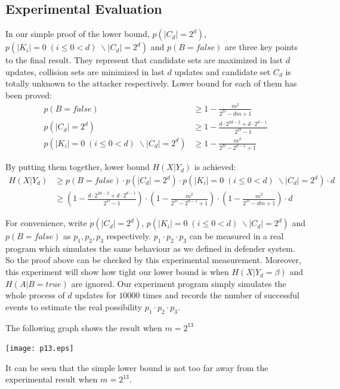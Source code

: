 \documentclass[10pt,a4paper]{article}
\begin{document}
	\subsection{Experimental Evaluation}
		In our simple proof of the lower bound, $p(|C_d| = 2^d)$,
		$p(|K_i| = 0 \; (i \leq 0 < d) \; \backslash |C_d| = 2^d)$ and $p(B = false)$ are 
		three key points to the final result.
		They represent that candidate sets are maximized in
		last $d$ updates, collision sets are minimized in
		last $d$ updates and candidate set $C_d$ is totally unknown
		to the attacker respectively.
		Lower bound for each of them has been proved:
		\begin{align*}
			p(B = false) &\geq 1-\frac{m^2}{2^D-dm+1}\\
			p(|C_d| = 2^d) &\geq 1-\frac{d \cdot 2^{2d-2}+d \cdot 2^{d-1}}{2^D-1}\\
			p(|K_i| = 0 \; (i \leq 0 < d) \; \backslash |C_d| = 2^d) &\geq 1-\frac{m^2}{2^D-2^{d-1}+1}
		\end{align*}
		
		By putting them together, lower bound $H(X | Y_d)$ is achieved:
		\begin{align*}
			H(X | Y_d) &\geq p(B = false) \cdot p(|C_d| = 2^d) \cdot 
				p(|K_i| = 0 \; (i \leq 0 < d) \; \backslash |C_d| = 2^d) \cdot d\\
				&\geq (1-\frac{d \cdot 2^{2d-2}+d \cdot 2^{d-1}}{2^D-1})
					\cdot (1-\frac{m^2}{2^D-2^{d-1}+1}) 
					\cdot (1-\frac{m^2}{2^D-dm+1}) \cdot d 
		\end{align*}
		
		For convenience, write $p(|C_d| = 2^d)$,
		$p(|K_i| = 0 \; (i \leq 0 < d) \; \backslash |C_d| = 2^d)$ and $p(B = false)$
		as $p_1, p_2, p_3$ respectively. 
		$p_1 \cdot p_2 \cdot p_3$ can be measured in a real program which 
		simulates the same behaviour as we defined in defender system.
		So the proof above can be checked by this experimental measurement.
		Moreover, this experiment will show how tight our lower bound is
		when $H(X | Y_d = \beta)$ and $H(A | B = true)$ are ignored.
		Our experiment program simply simulates the whole process of $d$ updates
		for $10000$ times and records the number of successful events
		to estimate the real possibility $p_1 \cdot p_2 \cdot p_3$.
		
		The following graph shows the result when $m = 2^{13}$
		\begin{center}
			\texttt{[image: p13.eps]}
		\end{center}
		It can be seen that the simple lower bound is not too
		far away from the experimental result when $m = 2^{13}$.
		
\end{document}
